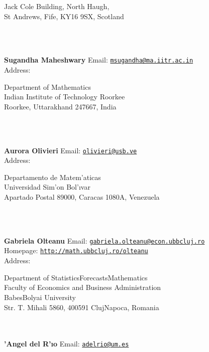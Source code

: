 \documentclass[a4paper,11pt]{report}
\begin{document}
\begin{titlepage}
{\begin{minipage}[t]{8cm}
 Jack Cole Building, North Haugh,\\
 St Andrews, Fife, KY16 9SX, Scotland \end{minipage}
}\\
{\mbox{}\\
\small \noindent \textbf{Sugandha Maheshwary   }  Email: \href{mailto://msugandha@ma.iitr.ac.in} {\texttt{msugandha@ma.iitr.ac.in}}\\
  Address: \begin{minipage}[t]{8cm}\noindent
 Department of Mathematics\\
 Indian Institute of Technology Roorkee\\
 Roorkee, Uttarakhand 247667, India \end{minipage}
}\\
{\mbox{}\\
\small \noindent \textbf{Aurora Olivieri   }  Email: \href{mailto://olivieri@usb.ve} {\texttt{olivieri@usb.ve}}\\
  Address: \begin{minipage}[t]{8cm}\noindent
 Departamento de Matem{\a'a}ticas\\
 Universidad Sim{\a'o}n Bol{\a'\i}var\\
 Apartado Postal 89000, Caracas 1080\texttt{}A, Venezuela \end{minipage}
}\\
{\mbox{}\\
\small \noindent \textbf{Gabriela Olteanu    }  Email: \href{mailto://gabriela.olteanu@econ.ubbcluj.ro} {\texttt{gabriela.olteanu@econ.ubbcluj.ro}}\\
  Homepage: \href{http://math.ubbcluj.ro/~olteanu} {\texttt{http://math.ubbcluj.ro/\texttt{}olteanu}}\\
  Address: \begin{minipage}[t]{8cm}\noindent
 Department of
Statistics\texttt{}Forecasts\texttt{}Mathematics\\
 Faculty of Economics and Business Administration\\
 Babes\texttt{}Bolyai University\\
 Str. T. Mihali 58\texttt{}60, 400591
Cluj\texttt{}Napoca, Romania \end{minipage}
}\\
{\mbox{}\\
\small \noindent \textbf{{\a'A}ngel del R{\a'\i}o    }  Email: \href{mailto://adelrio@um.es} {\texttt{adelrio@um.es}}\\
}
\end{titlepage}
\end{document}
